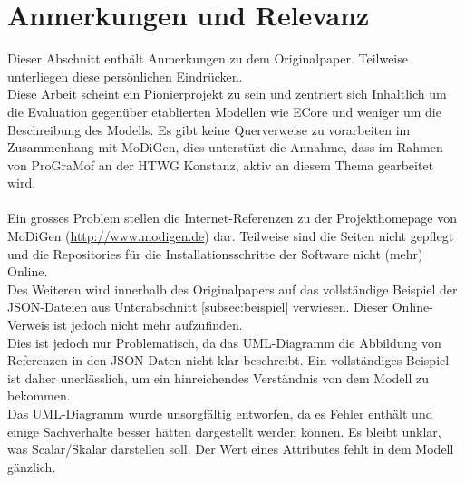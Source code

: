 \section{Anmerkungen und Relevanz}
Dieser Abschnitt enth\"alt Anmerkungen zu dem Originalpaper. Teilweise unterliegen diese pers\"onlichen Eindr\"ucken.\\
Diese Arbeit scheint ein Pionierprojekt zu sein und zentriert sich Inhaltlich um die Evaluation gegen\"uber etablierten Modellen wie ECore und weniger um die Beschreibung des Modells. Es gibt keine Querverweise zu vorarbeiten im Zusammenhang mit MoDiGen, dies unterst\"uzt die Annahme, dass im Rahmen von ProGraMof an der HTWG Konstanz, aktiv an diesem Thema gearbeitet wird.
\\\\
Ein grosses Problem stellen die Internet-Referenzen zu der Projekthomepage von MoDiGen (\url{http://www.modigen.de}) dar. Teilweise sind die Seiten nicht gepflegt und die Repositories f\"ur die Installationsschritte der Software nicht (mehr) Online.\\ 
Des Weiteren wird innerhalb des Originalpapers auf das vollst\"andige Beispiel der JSON-Dateien aus Unterabschnitt \ref{subsec:beispiel} verwiesen. Dieser Online-Verweis ist jedoch nicht mehr aufzufinden.\\
Dies ist jedoch nur Problematisch, da das UML-Diagramm die Abbildung von Referenzen in den JSON-Daten nicht klar beschreibt. Ein vollst\"andiges Beispiel ist daher unerl\"asslich, um ein hinreichendes Verst\"andnis von dem Modell zu bekommen.\\
Das UML-Diagramm wurde unsorgf\"altig entworfen, da es Fehler enth\"alt und einige Sachverhalte besser h\"atten dargestellt werden k\"onnen. Es bleibt unklar, was Scalar/Skalar darstellen soll. Der Wert eines Attributes fehlt in dem Modell g\"anzlich. 
